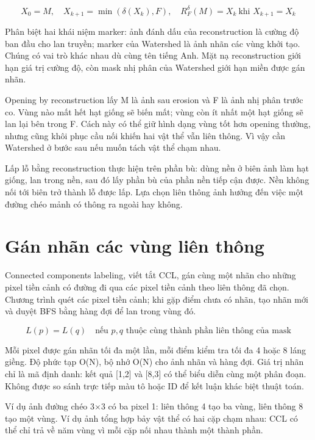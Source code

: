 \documentclass[12pt,a4paper,oneside]{report}
\begin{document}
\begin{equation}X_0=M,\quad X_{k+1}=\min(\delta(X_k),F),\quad R_F^\delta(M)=X_k\ \text{khi }X_{k+1}=X_k\end{equation}

Phân biệt hai khái niệm marker: ảnh đánh dấu của reconstruction là cường độ ban đầu cho lan truyền; marker của Watershed là ảnh nhãn các vùng khởi tạo. Chúng có vai trò khác nhau dù cùng tên tiếng Anh. Mặt nạ reconstruction giới hạn giá trị cường độ, còn mask nhị phân của Watershed giới hạn miền được gán nhãn.

Opening by reconstruction lấy M là ảnh sau erosion và F là ảnh nhị phân trước co. Vùng nào mất hết hạt giống sẽ biến mất; vùng còn ít nhất một hạt giống sẽ lan lại bên trong F. Cách này có thể giữ hình dạng vùng tốt hơn opening thường, nhưng cũng khôi phục cầu nối khiến hai vật thể vẫn liên thông. Vì vậy cần Watershed ở bước sau nếu muốn tách vật thể chạm nhau.

Lấp lỗ bằng reconstruction thực hiện trên phần bù: dùng nền ở biên ảnh làm hạt giống, lan trong nền, sau đó lấy phần bù của phần nền tiếp cận được. Nền không nối tới biên trở thành lỗ được lấp. Lựa chọn liên thông ảnh hưởng đến việc một đường chéo mảnh có thông ra ngoài hay không.

\section{Gán nhãn các vùng liên thông}
Connected components labeling, viết tắt CCL, gán cùng một nhãn cho những pixel tiền cảnh có đường đi qua các pixel tiền cảnh theo liên thông đã chọn. Chương trình quét các pixel tiền cảnh; khi gặp điểm chưa có nhãn, tạo nhãn mới và duyệt BFS bằng hàng đợi để lan trong vùng đó.

\begin{equation}L(p)=L(q)\quad\text{nếu }p,q\text{ thuộc cùng thành phần liên thông của mask}\end{equation}

Mỗi pixel được gán nhãn tối đa một lần, mỗi điểm kiểm tra tối đa 4 hoặc 8 láng giềng. Độ phức tạp O(N), bộ nhớ O(N) cho ảnh nhãn và hàng đợi. Giá trị nhãn chỉ là mã định danh: kết quả [1,2] và [8,3] có thể biểu diễn cùng một phân đoạn. Không được so sánh trực tiếp màu tô hoặc ID để kết luận khác biệt thuật toán.

Ví dụ ảnh đường chéo 3\ensuremath{\times}3 có ba pixel 1: liên thông 4 tạo ba vùng, liên thông 8 tạo một vùng. Ví dụ ảnh tổng hợp bảy vật thể có hai cặp chạm nhau: CCL có thể chỉ trả về năm vùng vì mỗi cặp nối nhau thành một thành phần.
\end{document}
